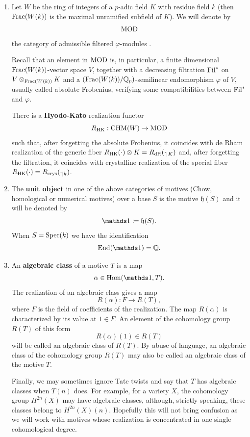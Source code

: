 \documentclass[11pt]{amsart}
\begin{document}
\begin{enumerate}
The realization functor are sometimes used in their enriched form, i.e. $R_B$ provides Hodge structures, $R_\ell$ provides Galois representations, $R_\dR$ provides filtered vector spaces and $R_\crys$ provides absolute Frobenius actions, see \cite[\S 7.1]{Andmot}.

\item\label{Hyodo-Kato} Let $W$ be the ring of integers  of a $p$-adic field $K$ with residue field $k$ (then $\mathrm{Frac} (W(k))$ is the maximal unramified subfield of $K$). We will denote by  \[\textnormal{MOD}\] the category  of admissible filtered $\varphi$-modules \cite{BertOgus,HyodoKato,NiziFred}.

Recall that an element in $\textnormal{MOD}$ is, in particular, a finite dimensional  $\mathrm{Frac} (W(k))$-vector space $V$, together with a decreasing filtration $\textnormal{Fil}^*$ on $V\otimes_{\mathrm{Frac} (W(k))} K$ and a $(\mathrm{Frac} (W(k))/\mathbb{Q}_p)$-semilinear endomorphism $\varphi$ of $V$, usually called absolute Frobenius, verifying some compatibilities between $\textnormal{Fil}^*$ and $\varphi$. 

There is a \textbf{Hyodo-Kato} realization functor \[R_{\mathrm{HK}}: \mathrm{CHM}(W)\rightarrow \textnormal{MOD}\]
such that, after forgetting the absolute Frobenius, it coincides with de Rham realization of the generic fiber $R_{\mathrm{HK}}(\cdot)\otimes K=R_{\mathrm{dR}}(\cdot_{\vert K})$  and, after forgetting the filtration, it coincides with  crystalline realization of the special fiber $R_{\mathrm{HK}}(\cdot) = R_{\textnormal{crys}}(\cdot_{\vert k})$. 
\item The \textbf{unit object} in one of the above categories of motives (Chow, homological or numerical motives) over a base $S$ is the motive $\mathfrak{h}(S)$ and it will be denoted by
\[\one \coloneqq \mathfrak{h}(S).\]
When $S=\textnormal{Spec}(k)$ we have the identification
\[\End(\one)=\Q.\]
\item An \textbf{algebraic class} of a motive $T$ is a map \[\alpha\in\Hom(\one, T).\]
The realization of an algebraic class gives a map
\[R(\alpha) : F \longrightarrow R(T),\]
where $F$ is the field of coefficients of the realization. 
The map $R(\alpha)$ is characterized by its value at $1\in F$. An element of the cohomology group $R(T)$ of this form
\[R(\alpha)(1) \in R(T)\]
will be called an algebraic class of  $R(T)$. By abuse of language, an algebraic class of the cohomology group $R(T)$ may also be called an algebraic class of the motive $T$.


Finally, we  may sometimes ignore Tate twists and say that $T$ has algebraic classes when $T(n)$ does. For example, for a variety $X$, the cohomology group $H^{2n}(X)$ may have algebraic classes, although, strictly speaking, these classes belong to $H^{2n}(X)(n).$ Hopefully this will not bring confusion as we will work with motives whose realization is concentrated in one single cohomological degree.
 


\end{enumerate}
\end{document}
